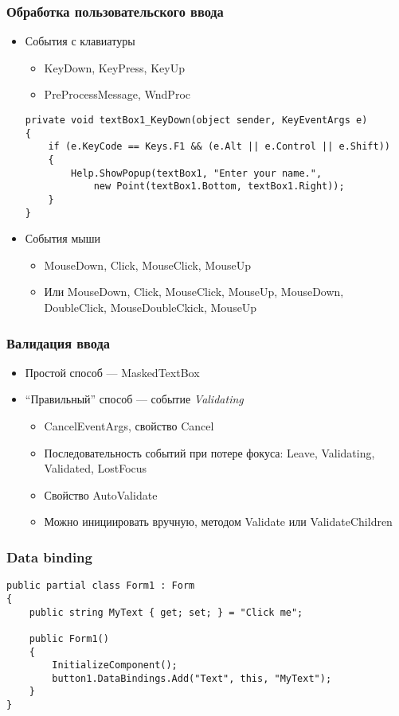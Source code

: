 \documentclass[xetex,mathserif,serif]{beamer}
\begin{document}
	\begin{frame}[fragile]
		\frametitle{Обработка пользовательского ввода}
		\begin{itemize}
			\item События с клавиатуры
			\begin{itemize}
				\item KeyDown, KeyPress, KeyUp
				\item PreProcessMessage, WndProc
			\end{itemize}
			\begin{scriptsize}
				\begin{verbatim}
private void textBox1_KeyDown(object sender, KeyEventArgs e)
{
    if (e.KeyCode == Keys.F1 && (e.Alt || e.Control || e.Shift))
    {
        Help.ShowPopup(textBox1, "Enter your name.", 
            new Point(textBox1.Bottom, textBox1.Right));
    }
}
				\end{verbatim}
			\end{scriptsize}
			\item События мыши
			\begin{itemize}
				\item MouseDown, Click, MouseClick, MouseUp
				\item Или MouseDown, Click, MouseClick, MouseUp, MouseDown, DoubleClick, MouseDoubleCkick, MouseUp
			\end{itemize}
		\end{itemize}
	\end{frame}

	\begin{frame}
		\frametitle{Валидация ввода}
		\begin{itemize}
			\item Простой способ --- MaskedTextBox
			\item ``Правильный'' способ --- событие \textit{Validating}
			\begin{itemize}
				\item CancelEventArgs, свойство Cancel
				\item Последовательность событий при потере фокуса: Leave, Validating, Validated, LostFocus
				\item Свойство AutoValidate
				\item Можно инициировать вручную, методом Validate или ValidateChildren
			\end{itemize}
		\end{itemize}
	\end{frame}

	\begin{frame}[fragile]
		\frametitle{Data binding}
		\begin{verbatim}
public partial class Form1 : Form
{
    public string MyText { get; set; } = "Click me";

    public Form1()
    {
        InitializeComponent();
        button1.DataBindings.Add("Text", this, "MyText");
    }
}
		\end{verbatim}
	\end{frame}
\end{document}
